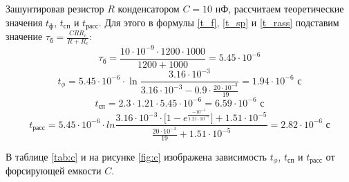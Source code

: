 Зашунтировав резистор $R$ конденсатором $C = 10$ нФ, рассчитаем теоретические значения $t_\text{ф}$, $t_\text{сп}$ и $t_\text{расс}$. Для этого в формулы \ref{t_f}, \ref{t_sp} и \ref{t_rass} подставим значение $\tau_\text{б} = \frac{CRR_c}{R+R_c}$:
\begin{equation*}
\tau_\text{б} = \frac{10 \cdot 10^{-9} \cdot 1200 \cdot 1000}{1200 + 1000} = 5.45 \cdot 10^{-6}
\end{equation*}
\begin{equation*}
t_\phi = 5.45 \cdot 10^{-6} \cdot \ln{\frac{3.16 \cdot 10^{-3}}{3.16 \cdot 10^{-3} - 0.9 \cdot \frac{20 \cdot 10^{-3}}{19}}} = 1.94 \cdot 10^{-6} \text{ с}
\end{equation*}
\begin{equation*}
t_\text{сп} = 2.3 \cdot 1.21 \cdot 5.45 \cdot 10^{-6} = 6.59 \cdot 10^{-6} \text{ с}
\end{equation*}
\begin{equation*}
t_\text{расс} = 5.45 \cdot 10^{-6} \cdot ln{\frac{3.16 \cdot 10^{-3} \cdot \Big [ 1 - e^{\frac{-10^{-5}}{1.21 \cdot 10^{-5}}} \Big ] + 1.51 \cdot 10^{-5}}{\frac{20 \cdot 10^{-3}}{19} + 1.51 \cdot 10^{-5}}} = 2.82 \cdot 10^{-6} \text{ с}
\end{equation*}

В таблице \ref{tab:c} и на рисунке \ref{fig:c} изображена зависимость $t_\phi$, $t_\text{сп}$ и $t_\text{расс}$ от форсирующей емкости $C$.

